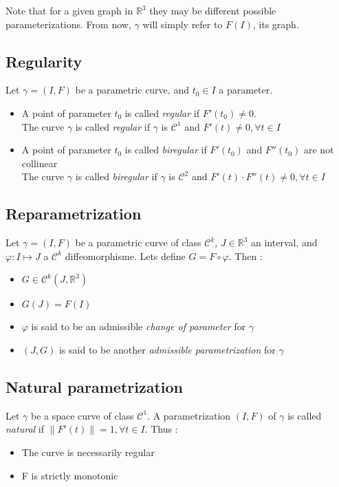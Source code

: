 \begin{myrk}
Note that for a given graph in ${\mathbb{R}}^3$ they may be different possible parameterizations. From now, $\gamma$ will simply refer to $F(I)$, its graph.
\end{myrk}

\subsection{Regularity}
Let $\gamma=(I,F)$ be a parametric \cite{Bloomenthal} curve, and $t_0 \in I$ a parameter.
\begin{itemize}
\item A point of parameter $t_0$ is called \emph{regular} if $F'(t_0) \neq 0$.
\\The curve $\gamma$ is called \emph{regular} if $\gamma$ is $\mathcal{C}^{1}$ and $F'(t) \neq 0, \forall t \in I$
\item A point of parameter $t_0$ is called \emph{biregular} if $F'(t_0)$ and $F''(t_0)$ are not collinear
\\The curve $\gamma$ is called \emph{biregular} if $\gamma$ is $\mathcal{C}^{2}$ and  $F'(t)\cdot    F''(t) \neq 0, \forall t \in I$
\end{itemize}

\subsection{Reparametrization}
Let $\gamma=(I,F)$ be a parametric curve of class ${\mathcal{C}}^{k}$, $J \in {\mathbb{R}}^{3}$ an interval, and $\varphi\colon I\mapsto J$ a ${\mathcal{C}}^{k}$ diffeomorphisme. Lets define $G=F\circ\varphi$. Then :
\begin{itemize}
\item $G\in{\mathcal{C}}^{k}(J,{\mathbb{R}}^3)$
\item $G(J)=F(I)$
\item $\varphi$ is said to be an admissible \emph{change of parameter} for $\gamma$
\item  $(J,G)$ is said to be another \emph{admissible parametrization} for $\gamma$
\end{itemize}

\subsection{Natural parametrization}
Let $\gamma$ be a space curve of class ${\mathcal{C}}^{1}$. A parametrization $(I,F)$ of $\gamma$ is called \emph{natural} if $\|F'(t)\| = 1, \forall t \in I$. Thus :
\begin{itemize}
\item The curve is necessarily regular
\item F is strictly monotonic
\end{itemize}

